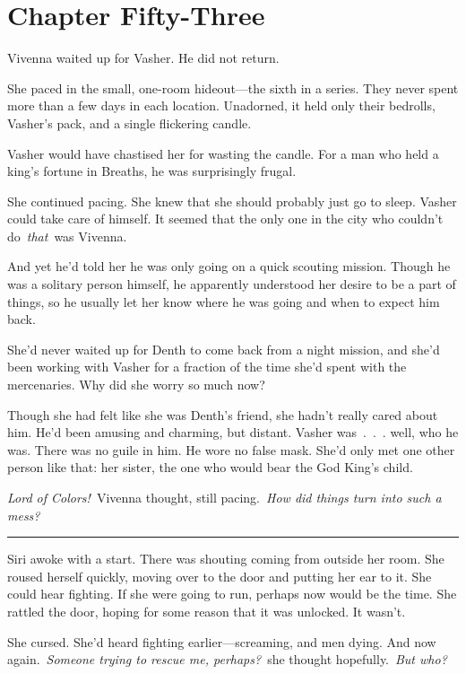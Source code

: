 \section{Chapter Fifty-Three}

Vivenna waited up for Vasher. He did not return.

She paced in the small, one-room hideout—the sixth in a series. They never spent more than a few days in each location. Unadorned, it held only their bedrolls, Vasher’s pack, and a single flickering candle.

Vasher would have chastised her for wasting the candle. For a man who held a king’s fortune in Breaths, he was surprisingly frugal.

She continued pacing. She knew that she should probably just go to sleep. Vasher could take care of himself. It seemed that the only one in the city who couldn’t do~\textit{that}~was Vivenna.

And yet he’d told her he was only going on a quick scouting mission. Though he was a solitary person himself, he apparently understood her desire to be a part of things, so he usually let her know where he was going and when to expect him back.

She’d never waited up for Denth to come back from a night mission, and she’d been working with Vasher for a fraction of the time she’d spent with the mercenaries. Why did she worry so much now?

Though she had felt like she was Denth’s friend, she hadn’t really cared about him. He’d been amusing and charming, but distant. Vasher was~.~.~. well, who he was. There was no guile in him. He wore no false mask. She’d only met one other person like that: her sister, the one who would bear the God King’s child.

\textit{Lord of Colors!}~Vivenna thought, still pacing.~\textit{How did things turn into such a mess?}

\bigskip \hrule \bigskip

Siri awoke with a start. There was shouting coming from outside her room. She roused herself quickly, moving over to the door and putting her ear to it. She could hear fighting. If she were going to run, perhaps now would be the time. She rattled the door, hoping for some reason that it was unlocked. It wasn’t.

She cursed. She’d heard fighting earlier—screaming, and men dying. And now again.~\textit{Someone trying to rescue me, perhaps?}~she thought hopefully.~\textit{But who?}

